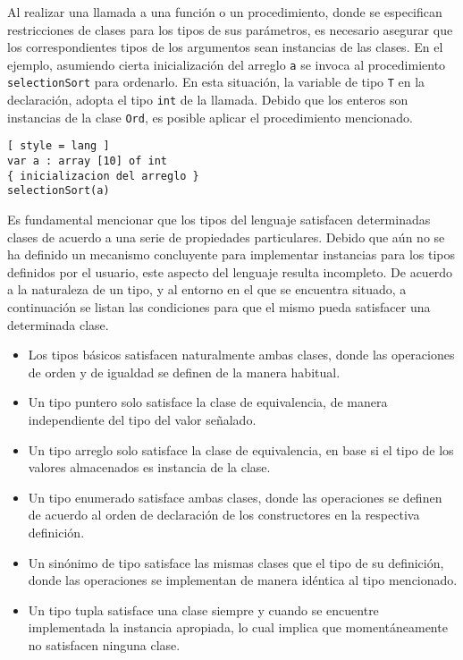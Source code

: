 Al realizar una llamada a una función o un procedimiento, donde se especifican restricciones de clases para los tipos de sus parámetros, es necesario asegurar que los correspondientes tipos de los argumentos sean instancias de las clases.
En el ejemplo, asumiendo cierta inicialización del arreglo \lstinline[style = lang]{a} se invoca al procedimiento \lstinline[style = lang]{selectionSort} para ordenarlo.
En esta situación, la variable de tipo \lstinline[style = lang]{T} en la declaración, adopta el tipo \lstinline[style = lang]{int} de la llamada.
Debido que los enteros son instancias de la clase \lstinline[style = lang]{Ord}, es posible aplicar el procedimiento mencionado.

\begin{lstlisting}[ style = lang ]
var a : array [10] of int
{ inicializacion del arreglo }
selectionSort(a)
\end{lstlisting}

Es fundamental mencionar que los tipos del lenguaje satisfacen determinadas clases de acuerdo a una serie de propiedades particulares.
Debido que aún no se ha definido un mecanismo concluyente para implementar instancias para los tipos definidos por el usuario, este aspecto del lenguaje resulta incompleto.
De acuerdo a la naturaleza de un tipo, y al entorno en el que se encuentra situado, a continuación se listan las condiciones para que el mismo pueda satisfacer una determinada clase.
\begin{itemize}
\item
Los tipos básicos satisfacen naturalmente ambas clases, donde las operaciones de orden y de igualdad se definen de la manera habitual.
\item
Un tipo puntero solo satisface la clase de equivalencia, de manera independiente del tipo del valor señalado.
\item
Un tipo arreglo solo satisface la clase de equivalencia, en base si el tipo de los valores almacenados es instancia de la clase.
\item
Un tipo enumerado satisface ambas clases, donde las operaciones se definen de acuerdo al orden de declaración de los constructores en la respectiva definición.
\item
Un sinónimo de tipo satisface las mismas clases que el tipo de su definición, donde las operaciones se implementan de manera idéntica al tipo mencionado.
\item
Un tipo tupla satisface una clase siempre y cuando se encuentre implementada la instancia apropiada, lo cual implica que momentáneamente no satisfacen ninguna clase.
\end{itemize}

